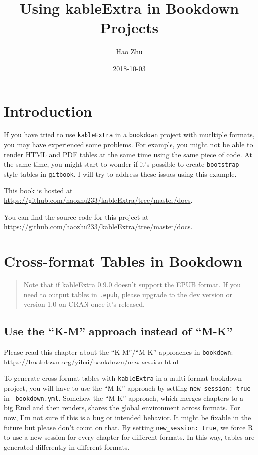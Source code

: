 \documentclass[]{book}
\title{Using kableExtra in Bookdown Projects}
\author{Hao Zhu}
\date{2018-10-03}
\begin{document}
\maketitle

{
\setcounter{tocdepth}{1}
\tableofcontents
}
\hypertarget{introduction}{%
\chapter{Introduction}\label{introduction}}

If you have tried to use \texttt{kableExtra} in a \texttt{bookdown}
project with mutltiple formats, you may have experienced some problems.
For example, you might not be able to render HTML and PDF tables at the
same time using the same piece of code. At the same time, you might
start to wonder if it's possible to create \texttt{bootstrap} style
tables in \texttt{gitbook}. I will try to address these issues using
this example.

This book is hosted at
\url{https://github.com/haozhu233/kableExtra/tree/master/docs}.

You can find the source code for this project at
\url{https://github.com/haozhu233/kableExtra/tree/master/docs}.

\hypertarget{cross-format-tables-in-bookdown}{%
\chapter{Cross-format Tables in
Bookdown}\label{cross-format-tables-in-bookdown}}

\begin{quote}
Note that if kableExtra 0.9.0 doesn't support the EPUB format. If you
need to output tables in \texttt{.epub}, please upgrade to the dev
version or version 1.0 on CRAN once it's released.
\end{quote}

\hypertarget{use-the-k-m-approach-instead-of-m-k}{%
\section{Use the ``K-M'' approach instead of
``M-K''}\label{use-the-k-m-approach-instead-of-m-k}}

Please read this chapter about the ``K-M''/``M-K'' approaches in
\texttt{bookdown}:
\url{https://bookdown.org/yihui/bookdown/new-session.html}

To generate cross-format tables with \texttt{kableExtra} in a
multi-format bookdown project, you will have to use the ``M-K'' approach
by setting \texttt{new\_session:\ true} in \texttt{\_bookdown.yml}.
Somehow the ``M-K'' approach, which merges chapters to a big Rmd and
then renders, shares the global environment across formats. For now, I'm
not sure if this is a bug or intended behavior. It might be fixable in
the future but please don't count on that. By setting
\texttt{new\_session:\ true}, we force R to use a new session for every
chapter for different formats. In this way, tables are generated
differently in different formats.
\end{document}
